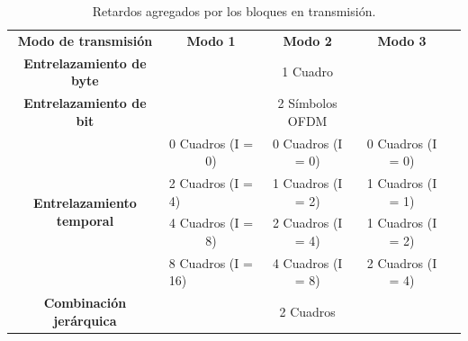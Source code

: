 \begin{table}[h!]
\centering
\begin{tabular}{|c|cccc}   %
\cline{1-4}
\textbf{Modo de transmisi\'on} & \multicolumn{1}{c|}{\textbf{Modo 1}} & \multicolumn{1}{c|}{\textbf{Modo 2}} & \multicolumn{1}{c|}{\textbf{Modo 3}} &  \\ \cline{1-4}
\textbf{Entrelazamiento de byte} 					&                   			  & 1 Cuadro 					   & \multicolumn{1}{c|}{} 			&  \\ \cline{1-4}
\textbf{Entrelazamiento de bit} 						&					   			  & 2 S\'imbolos OFDM 			   & \multicolumn{1}{c|}{} 			&  \\ \cline{1-4}
\multirow{4}{*}{\textbf{Entrelazamiento temporal}}	&\multicolumn{1}{c|}{0 Cuadros (I = 0)} & \multicolumn{1}{c|}{0 Cuadros (I = 0)} & \multicolumn{1}{c|}{0 Cuadros (I = 0)} &  \\ \cline{2-4}
  										    &\multicolumn{1}{l|}{2 Cuadros (I = 4)} & \multicolumn{1}{c|}{1 Cuadros (I = 2)} & \multicolumn{1}{c|}{1 Cuadros (I = 1)} &  \\ \cline{2-4}
											&\multicolumn{1}{c|}{4 Cuadros (I = 8)} & \multicolumn{1}{c|}{2 Cuadros (I = 4)} & \multicolumn{1}{c|}{1 Cuadros (I = 2)} &  \\ \cline{2-4}
											&\multicolumn{1}{l|}{8 Cuadros (I = 16)} & \multicolumn{1}{c|}{4 Cuadros (I = 8)} & \multicolumn{1}{c|}{2 Cuadros (I = 4)} &  \\ \cline{1-4}
\textbf{Combinaci\'on jer\'arquica}			& 				   			    & 2 Cuadros 			 & \multicolumn{1}{c|}{} 		  &  \\ \cline{1-4}
\end{tabular}
\caption{\label{delays_agregados} Retardos agregados por los bloques en transmisi\'on.}
\end{table}